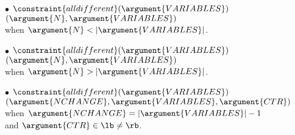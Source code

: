 \begin{ctrdesc}
 \begin{minipage}[t]{11.2cm}
$\bullet$ $\constraint{alldifferent}(\argument{VARIABLES})$\\
\hspace*{7pt}{\bf implies}\hspace*{1pt} $ $\hyperlink{Csoft_all_equal_max_var}{}$(\argument{N},\argument{VARIABLES})$\\
 \hspace*{10pt} when\hspace*{3pt} $\argument{N}<|\argument{VARIABLES}|$.
\end{minipage}
\vspace{0.16cm}

 \begin{minipage}[t]{11.2cm}
$\bullet$ $\constraint{alldifferent}(\argument{VARIABLES})$\\
\hspace*{7pt}{\bf implies}\hspace*{1pt} $ $\hyperlink{Csoft_all_equal_min_var}{}$(\argument{N},\argument{VARIABLES})$\\
 \hspace*{10pt} when\hspace*{3pt} $\argument{N}>|\argument{VARIABLES}|$.
\end{minipage}
\vspace{0.16cm}

 \begin{minipage}[t]{11.2cm}
$\bullet$ $\constraint{alldifferent}(\argument{VARIABLES})$\\
\hspace*{7pt}{\bf implies}\hspace*{1pt} $ $\hyperlink{Cchange}{}$(\argument{NCHANGE},\argument{VARIABLES},\argument{CTR})$\\
 \hspace*{10pt} when\hspace*{3pt} $\argument{NCHANGE}=|\argument{VARIABLES}|-1$\\
 \hspace*{10pt} and\hspace*{9pt} $\argument{CTR}\in \lb\neq \rb$.
\end{minipage}
\vspace{0.16cm}


\end{ctrdesc}
